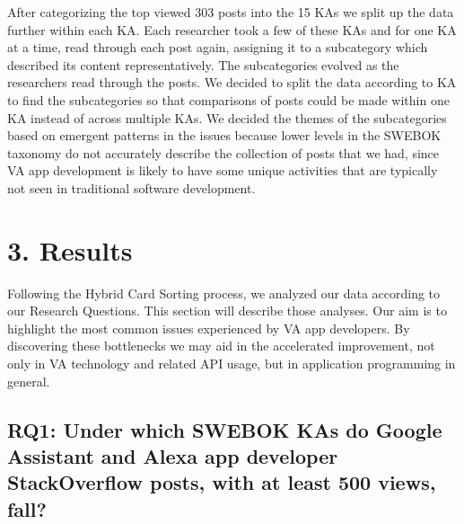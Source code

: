 \documentclass{sigchi}
\begin{document}
After categorizing the top viewed 303 posts into the 15 KAs we split up the data further within each KA. Each researcher took a few of these KAs and for one KA at a time, read through each post again, assigning it to a subcategory which described its content representatively. The subcategories evolved as the researchers read through the posts. We decided to split the data according to KA to find the subcategories so that comparisons of posts could be made within one KA instead of across multiple KAs. 
We decided the themes of the subcategories based on emergent patterns in the issues because lower levels in the SWEBOK taxonomy do not accurately describe the collection of posts that we had, since VA app development is likely to have some unique activities that are typically not seen in traditional software development.

\section{3. Results}
Following the Hybrid Card Sorting process, we analyzed our data according to our Research Questions. This section will describe those analyses. Our aim is to highlight the most common issues experienced by VA app developers. By discovering these bottlenecks we may aid in the accelerated improvement, not only in VA technology and related API usage, but in application programming in general.

 \subsection{RQ1: Under which SWEBOK KAs do Google Assistant and Alexa app developer StackOverflow posts, with at least 500 views, fall?}
\end{document}
